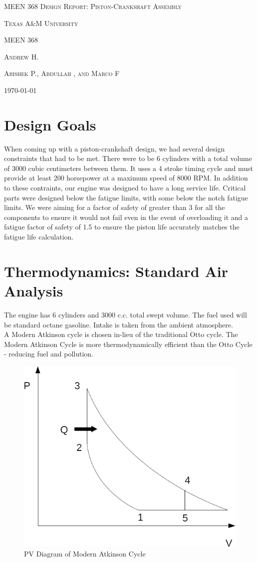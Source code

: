 \documentclass[10pt,a4paper]{article}
\begin{document}
	\begin{titlepage}
		\centering
		{\scshape\Huge MEEN 368 Design Report: Piston-Crankshaft Assembly}	
		\vspace{1cm}	
		
		{\scshape\Large Texas A\&M University}
		
		{\scshape \large MEEN 368}
		
		\vspace{3 cm}
		
	{\scshape \normalsize Andrew H.}		
		
		{\scshape \normalsize Abishek P., Abdullah , and Marco F}

		

		\vfill
		
		{\Large \today}
	\end{titlepage}
\section*{Design Goals}
When coming up with a piston-crankshaft design, we had several design constraints that had to be met. There were to be 6 cylinders with 
  a total volume of 3000 cubic centimeters between them. It uses a 4 stroke timing cycle and must provide at least 200 horsepower at a 
  maximum speed of 8000 RPM. In addition to these contraints, our engine was designed to have a long service life. Critical parts were designed below the fatigue limits, with some below the notch fatigue limits.
 We were aiming for a factor of safety of greater than 3 for all the components to ensure it would not fail even in the
  event of overloading it and a fatigue factor of safety of 1.5 to ensure the piston life accurately matches the fatigue life calculation. 
\newpage
\section*{Thermodynamics: Standard Air Analysis}

The engine has 6 cylinders and 3000 c.c. total swept volume. The fuel used will be standard octane gasoline. Intake is taken from the ambient atmosphere.\\
	A Modern Atkinson cycle is chosen in-lieu of the traditional Otto cycle. The Modern Atkinson Cycle is more thermodynamically efficient than the Otto Cycle - reducing fuel and pollution.
	\begin{figure}[h]
		\centering
		\includegraphics[width=.5\textwidth]{ThermoDiagram.png}
		\caption{PV Diagram of Modern Atkinson Cycle}
		\label{fig:diagram1}
	\end{figure}
	
\end{document}

